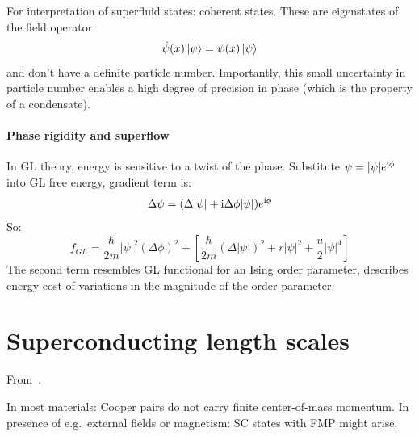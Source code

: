\documentclass[../notes.tex]{subfiles}
\begin{document}
For interpretation of superfluid states: coherent states.
These are eigenstates of the field operator
\begin{equation}
	\hat{\psi}(x) \ket{\psi} = \psi (x) \ket{\psi} 
\end{equation}
and don't have a definite particle number.
Importantly, this small uncertainty in particle number enables a high degree of precision in phase (which is the property of a condensate).


\paragraph{Phase rigidity and superflow}

In GL theory, energy is sensitive to a twist of the phase.
Substitute \(\psi = \vert \psi \vert e^{\mathrm{i} \phi}\) into GL free energy, gradient term is:
\begin{equation}
	\Delta \psi = (\Delta \vert \psi \vert + \mathrm{i} \Delta \phi \vert \psi \vert) e^{\mathrm{i} \phi}
\end{equation}
So:
\begin{equation}
	f_{GL}  = \frac{\hbar}{2m} \vert \psi \vert^2 (\Delta \phi)^2 + \left[ \frac{\hbar}{2m} (\Delta \vert \psi \vert)^2 + r \vert \psi \vert^2 + \frac{u}{2} \vert \psi \vert^4 \right]
\end{equation}
The second term resembles GL functional for an Ising order parameter, describes energy cost of variations in the magnitude of the order parameter.



\section{Superconducting length scales}

From~\cite{wittBypassingLatticeBCSBEC2024}.


In most materials: Cooper pairs do not carry finite center-of-mass momentum.
In presence of e.g.\ external fields or magnetism: SC states with FMP might arise.
\end{document}

